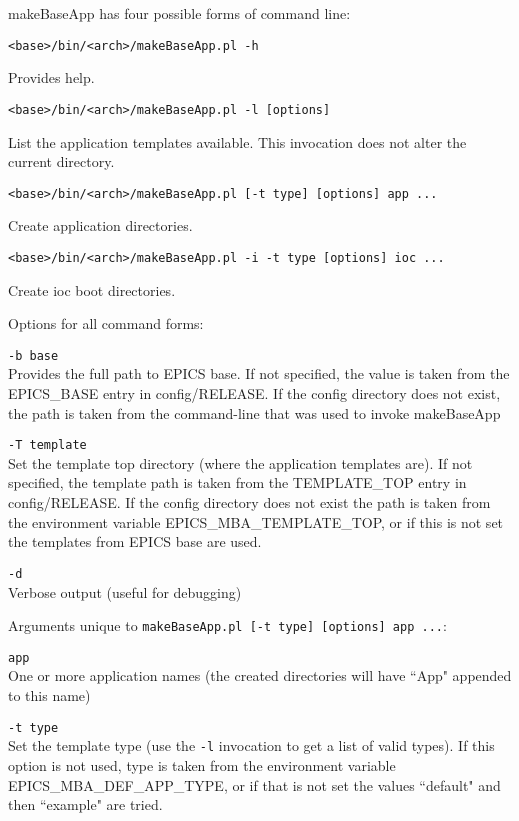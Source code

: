 makeBaseApp has four possible forms of command line:

\begin{verbatim}
<base>/bin/<arch>/makeBaseApp.pl -h
\end{verbatim}
Provides help.

\begin{verbatim}
<base>/bin/<arch>/makeBaseApp.pl -l [options]
\end{verbatim}
List the application templates available. This invocation does not alter the current directory.

\begin{verbatim}
<base>/bin/<arch>/makeBaseApp.pl [-t type] [options] app ... 
\end{verbatim}
Create application directories.

\begin{verbatim}
<base>/bin/<arch>/makeBaseApp.pl -i -t type [options] ioc ... 
\end{verbatim}
Create ioc boot directories.

Options for all command forms:

\begin{description}
\item \verb|-b base| \\
Provides the full path to EPICS base.
If not specified, the value is taken from the EPICS\_BASE entry in config/RELEASE.
If the config directory does not exist, the path is taken from the command-line that was used to invoke makeBaseApp

\item \verb|-T template| \\
Set the template top directory (where the application templates are).
If not specified, the template path is taken from the TEMPLATE\_TOP entry in config/RELEASE.
If the config directory does not exist the path is taken from the environment variable EPICS\_MBA\_TEMPLATE\_TOP, or if this is not set the templates from EPICS base are used.

\item \verb|-d| \\
Verbose output (useful for debugging)
\end{description}

Arguments unique to \verb|makeBaseApp.pl [-t type] [options] app ...|:

\begin{description}
\item \verb|app| \\
One or more application names (the created directories will have ``App" appended to this name)

\item \verb|-t type| \\
Set the template type (use the \verb|-l| invocation to get a list of valid types).
If this option is not used, type is taken from the environment variable EPICS\_MBA\_DEF\_APP\_TYPE, or if that is not set the values ``default" and then ``example" are tried.
\end{description}

